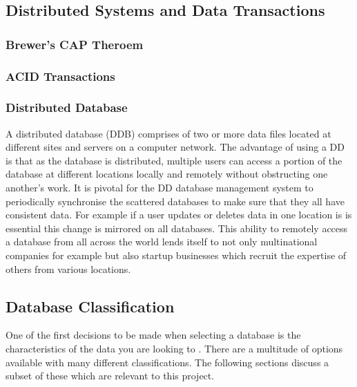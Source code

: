 \subsection{Distributed Systems and Data Transactions}\label{distrosystems}
\subsubsection{Brewer's CAP Theroem}\label{captheroem}
\subsubsection{ACID Transactions}\label{acid}
\subsubsection{Distributed Database}\label{distributeddb}
A distributed database (DDB) comprises of two or more data files located at different sites and servers on a computer network. \cite{dd} The advantage of using a DD is that as the database is distributed, multiple users can access a portion of the database at different locations locally and remotely without obstructing one another's work. It is  pivotal for the DD database management system to periodically synchronise the scattered databases to make sure that they all have consistent data.  \cite{dd} For example if a user updates or deletes data in one location is is essential this change is mirrored on all databases. This ability to remotely access a database from all across the world lends itself to not only multinational companies for example but also startup businesses which recruit the expertise of others from various locations.

\subsection{Database Classification}\label{dbclass}
One of the first decisions to be made when selecting a database is the characteristics of the data you are looking to . \cite{nosql2} There are a multitude of options available with many different classifications. The following sections discuss a subset of these which are relevant to this project.

